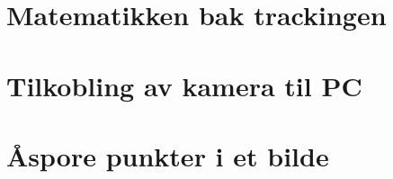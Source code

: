 \section{Matematikken bak trackingen}

	

\section{Tilkobling av kamera til PC}

	

\section{\AA \space spore punkter i et bilde}

	